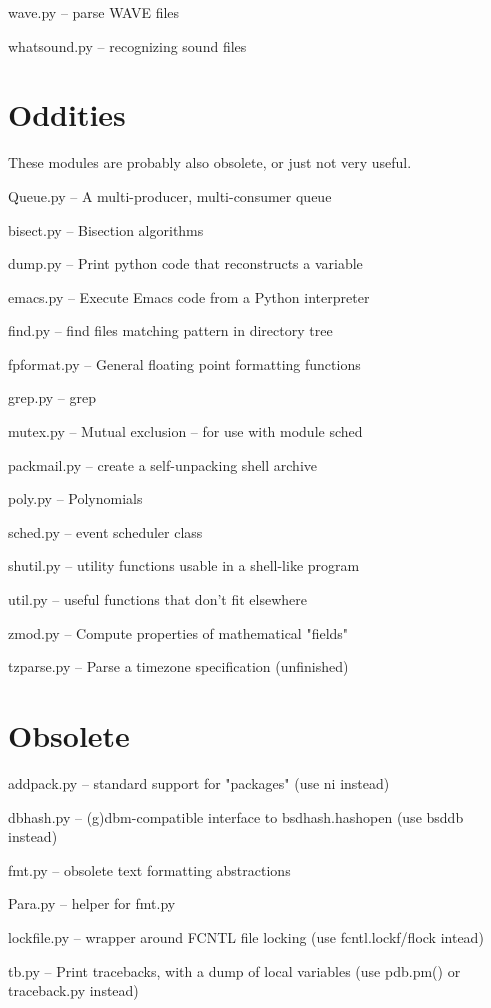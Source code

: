 wave.py -- parse WAVE files

whatsound.py -- recognizing sound files


\section{Oddities}

These modules are probably also obsolete, or just not very useful.

Queue.py -- A multi-producer, multi-consumer queue

bisect.py -- Bisection algorithms

dump.py -- Print python code that reconstructs a variable

emacs.py -- Execute Emacs code from a Python interpreter

find.py -- find files matching pattern in directory tree

fpformat.py -- General floating point formatting functions

grep.py -- grep

mutex.py -- Mutual exclusion -- for use with module sched

packmail.py -- create a self-unpacking shell archive

poly.py -- Polynomials

sched.py -- event scheduler class

shutil.py -- utility functions usable in a shell-like program

util.py -- useful functions that don't fit elsewhere

zmod.py -- Compute properties of mathematical "fields"

tzparse.py -- Parse a timezone specification (unfinished)


\section{Obsolete}

addpack.py -- standard support for "packages" (use ni instead)

dbhash.py -- (g)dbm-compatible interface to bsdhash.hashopen (use
bsddb instead)

fmt.py -- obsolete text formatting abstractions

Para.py -- helper for fmt.py

lockfile.py -- wrapper around FCNTL file locking (use
fcntl.lockf/flock intead)

tb.py -- Print tracebacks, with a dump of local variables (use
pdb.pm() or traceback.py instead)


